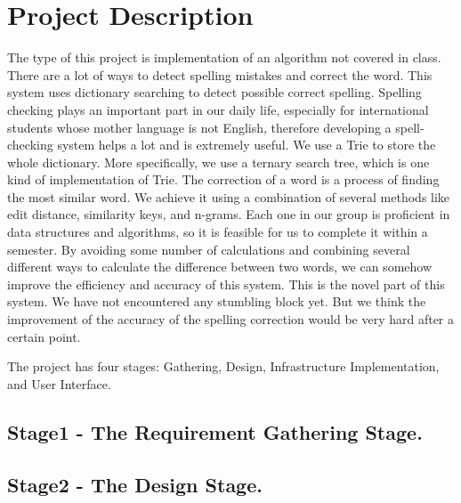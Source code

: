 \documentclass[10pt,conference]{IEEEtran}
\begin{document}
\section{Project Description}\label{sec:1. Project Description}
\textnormal{
	The type of this project is implementation of an algorithm not covered in class.
 There are a lot of ways to detect spelling mistakes and correct the word. This system uses dictionary searching to detect possible correct spelling. Spelling checking plays an important part in our daily life, especially for international students whose mother language is not English, therefore developing a spell-checking system helps a lot and is extremely useful. 
We use a Trie to store the whole dictionary. More specifically, we use a ternary search tree, which is one kind of implementation of Trie. The correction of a word is a process of finding the most similar word. We achieve it using a combination of several methods like edit distance, similarity keys, and n-grams. Each one in our group is proficient in data structures and algorithms, so it is feasible for us to complete it within a semester. 
By avoiding some number of calculations and combining several different ways to calculate the difference between two words, we can somehow improve the efficiency and accuracy of this system. This is the novel part of this system.
We have not encountered any stumbling block yet. But we think the improvement of the accuracy of the spelling correction would be very hard after a certain point.
}

The project has four stages: Gathering, Design, Infrastructure Implementation, and User Interface.

%
\subsection{Stage1 - The Requirement Gathering Stage. }\label{sec:1 Requirement Gathering Stage. }


\subsection{Stage2 - The Design Stage. }\label{sec: 2:The Design Stage.}

%
\end{document}
